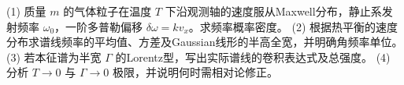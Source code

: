 (1) 质量 \(m\) 的气体粒子在温度 \(T\) 下沿观测轴的速度服从Maxwell分布，静止系发射频率 \(\omega_0\)，一阶多普勒偏移 \(\delta\omega=kv_x\)。求频率概率密度。
(2) 根据热平衡的速度分布求谱线频率的平均值、方差及Gaussian线形的半高全宽，并明确角频率单位。
(3) 若本征谱为半宽 \(\Gamma\) 的Lorentz型，写出实际谱线的卷积表达式及总强度。
(4) 分析 \(T\to0\) 与 \(\Gamma\to0\) 极限，并说明何时需相对论修正。
